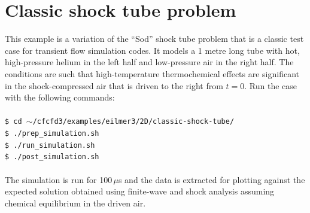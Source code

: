 
\section{Classic shock tube problem}
%
This example is a variation of the ``Sod'' shock tube problem that is a classic
test case for transient flow simulation codes.
It models a 1 metre long tube with hot, high-pressure helium in the left half and
low-pressure air in the right half.
The conditions are such that high-temperature thermochemical effects are significant
in the shock-compressed air that is driven to the right from $t=0$.
Run the case with the following commands:\\
%
\topbar\\
\texttt{\$ cd $\sim$/cfcfd3/examples/eilmer3/2D/classic-shock-tube/}\\
\texttt{\$ ./prep\_simulation.sh}\\
\texttt{\$ ./run\_simulation.sh}\\
\texttt{\$ ./post\_simulation.sh}\\
\bottombar\\
%

The simulation is run for 100\,$\mu$s and the data is extracted for plotting against
the expected solution obtained using finite-wave and shock analysis assuming chemical equilibrium 
in the driven air.

